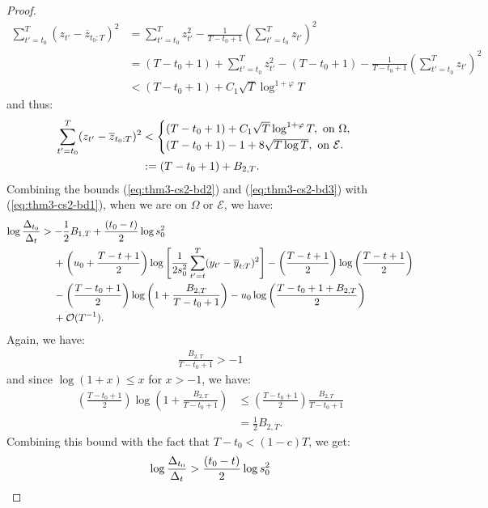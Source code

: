 \begin{proof}
\begin{align*}
    \sum_{t'=t_0}^T (z_{t'} - \overline{z}_{t_0:T})^2 &= \sum_{t'=t_0}^T z^2_{t'} - \frac{1}{T-t_0+1} \left(\sum_{t'=t_0}^T z_{t'}\right)^2 \\
    &= (T-t_0+1) + \sum_{t'=t_0}^T z^2_{t'} - (T-t_0+1) - \frac{1}{T-t_0+1} \left(\sum_{t'=t_0}^T z_{t'}\right)^2 \\
    &< (T-t_0+1) + C_1\sqrt{T}\log^{1+\varphi} T 
\end{align*}
and thus:
\small
\begin{align}
    \sum_{t'=t_0}^T (z_{t'} - \overline{z}_{t_0:T})^2 &< 
    \begin{cases}
    (T - t_0 +1) +  C_1\sqrt{T}\log^{1+\varphi} T , \text{ on } \Omega, \\
    (T - t_0 + 1) -1 + 8\sqrt{T \log T}, \text{ on } \mathcal{E}.
    \end{cases} \notag \\
    &:= (T - t_0 + 1) + B_{2,T}.
    \label{eq:thm3-cs2-bd3}
\end{align}
\normalsize
Combining the bounds (\ref{eq:thm3-cs2-bd2}) and (\ref{eq:thm3-cs2-bd3}) with (\ref{eq:thm3-cs2-bd1}), when we are on $\Omega$ or $\mathcal{E}$, we have:
\begin{align*}
    \log \frac{\Delta_{t_0}}{\Delta_t} &> - \frac{1}{2} B_{1,T} + \frac{(t_0-t)}{2}\log s_0^2 \notag \\
    &\quad\: + \left(u_0 + \frac{T - t +1}{2}\right)\log\left[ \frac{1}{2s_0^2}\sum_{t'=t}^T (y_{t'} - \overline{y}_{t:T})^2 \right] - \left(\frac{T - t + 1}{2}\right) \log\left(\frac{T-t+1}{2}\right)\notag\\
    &\quad\: - \left(\frac{T - t_0+1}{2}\right)\log\left(1 + \frac{B_{2,T}}{T-t_0+1}\right) - u_0\log\left(\frac{T-t_0 + 1 + B_{2,T}}{2}\right) \notag \\
    &\quad\: +  \mathcal{O}(T^{-1}). 
\end{align*}
Again, we have:
\begin{align*}
    \frac{B_{2,T}}{T-t_0+1} > -1
\end{align*}
and since $\log(1+x) \leq x$ for $x > -1$, we have:
\begin{align*}
    \left(\frac{T - t_0 + 1}{2}\right)\log\left(1 + \frac{B_{2,T}}{T-t_0+1}\right)  &\leq \left(\frac{T - t_0 + 1}{2}\right) \frac{B_{2,T}}{T-t_0+1} \\
    &= \frac{1}{2}B_{2,T}.
\end{align*}
Combining this bound with the fact that $T-t_0 < (1-c)T$, we get:
\begin{align}
    \log \frac{\Delta_{t_0}}{\Delta_t} &> \frac{(t_0-t)}{2}\log s_0^2 \notag \\

\end{align}
\end{proof}

